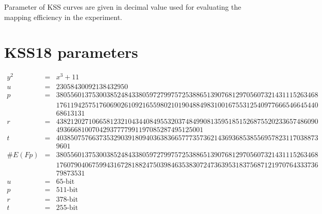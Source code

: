 
\label{AppendixA} %
Parameter of KSS curves are given in decimal value used for evaluating the mapping efficiency in the experiment.
\section{KSS18 parameters}
\begin{eqnarray}
y^2 & = & x^3 + 11 \nonumber \\ 
u & = & 23058430092138432950 \nonumber \\ 
p & = &  3805560137530038524843380597279975725388651390768129705607321431115263468 \nonumber \\
& & 1761194257517606902610921655980210190488498310016755312540977666546645440 \nonumber \\
& & 68613131 \nonumber \\
r & = &  4382120271066581232104344084955320374849908135951851526875520233657486090 \nonumber \\
& &  49366681007042937777991197085287495125001 \nonumber \\
t & = &  4038507576637353290391809403638366577735736214369368538556957823117038873\nonumber \\
& & 9601\nonumber \\
\#E(Fp) & = &  3805560137530038524843380597279975725388651390768129705607321431115263468 \nonumber \\
& &  1760790406759943167281882475039846353830724736395318375687121970764333736 \nonumber \\
& & 79873531 \nonumber \\
u & = & 65\text{-bit}  \nonumber \\
p & = & 511\text{-bit}  \nonumber \\
r &  = & 378\text{-bit}  \nonumber \\
t & = & 255\text{-bit} \nonumber
\end{eqnarray}


